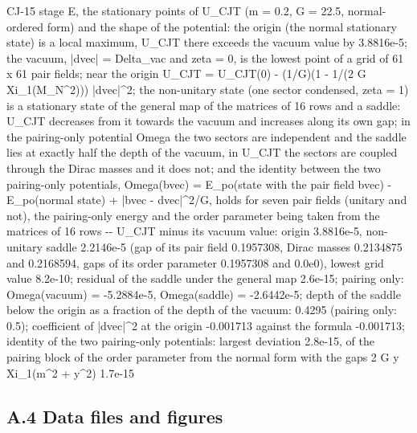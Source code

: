 \documentclass[
  10pt,
]{article}
\newenvironment{Shaded}{}{}
\newcommand{\NormalTok}[1]{#1}
\begin{document}
\begin{Shaded}
\begin{Highlighting}[]
\NormalTok{[PASS] CJ{-}15  stage E, the stationary points of U\_CJT (m = 0.2, G = 22.5, normal{-}ordered form) and the shape of the potential: the origin (the normal stationary state) is a local maximum, U\_CJT there exceeds the vacuum value by 3.8816e{-}5; the vacuum, |dvec| = Delta\_vac and zeta = 0, is the lowest point of a grid of 61 x 61 pair fields; near the origin U\_CJT = U\_CJT(0) {-} (1/G)(1 {-} 1/(2 G Xi\_1(M\_N\^{}2))) |dvec|\^{}2; the non{-}unitary state (one sector condensed, zeta = 1) is a stationary state of the general map of the matrices of 16 rows and a saddle: U\_CJT decreases from it towards the vacuum and increases along its own gap; in the pairing{-}only potential Omega the two sectors are independent and the saddle lies at exactly half the depth of the vacuum, in U\_CJT the sectors are coupled through the Dirac masses and it does not; and the identity between the two pairing{-}only potentials, Omega(bvec) = E\_po(state with the pair field bvec) {-} E\_po(normal state) + |bvec {-} dvec|\^{}2/G, holds for seven pair fields (unitary and not), the pairing{-}only energy and the order parameter being taken from the matrices of 16 rows  {-}{-} U\_CJT minus its vacuum value: origin 3.8816e{-}5, non{-}unitary saddle 2.2146e{-}5 (gap of its pair field 0.1957308, Dirac masses 0.2134875 and 0.2168594, gaps of its order parameter 0.1957308 and 0.0e0), lowest grid value 8.2e{-}10; residual of the saddle under the general map 2.6e{-}15; pairing only: Omega(vacuum) = {-}5.2884e{-}5, Omega(saddle) = {-}2.6442e{-}5; depth of the saddle below the origin as a fraction of the depth of the vacuum: 0.4295 (pairing only: 0.5); coefficient of |dvec|\^{}2 at the origin {-}0.001713 against the formula {-}0.001713; identity of the two pairing{-}only potentials: largest deviation 2.8e{-}15, of the pairing block of the order parameter from the normal form with the gaps 2 G y Xi\_1(m\^{}2 + y\^{}2) 1.7e{-}15}
\end{Highlighting}
\end{Shaded}

\hypertarget{a.4-data-files-and-figures}{%
\subsection{A.4 Data files and
figures}\label{a.4-data-files-and-figures}}
\end{document}
